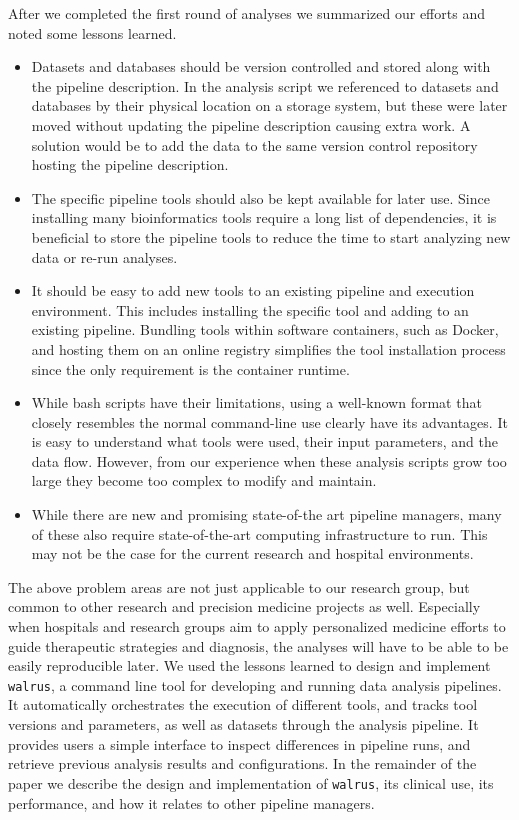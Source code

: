 After we completed the first round of analyses we summarized our efforts and
noted some lessons learned. 
\begin{itemize}
    \item  Datasets and databases should be version controlled and stored
        along with the pipeline description. In the analysis script we
        referenced to datasets and databases by their physical location on a
        storage system, but these were later moved without updating the pipeline
        description causing extra work. A solution would be to add the data to
        the same version control repository hosting the pipeline description.
    \item The specific pipeline tools should also be kept available for
        later use.  Since installing many bioinformatics tools require a long list
        of dependencies, it is beneficial to store the pipeline tools to reduce
        the time to start analyzing new data or re-run analyses. 
    \item It should be easy to add new tools to an existing
        pipeline and execution environment. This includes installing the specific
        tool and adding to an existing pipeline. Bundling tools within software
        containers, such as Docker, and hosting them on an online registry
        simplifies the tool installation process since the only requirement is
        the container runtime.
    \item While bash scripts have their
        limitations, using a well-known format that closely resembles the normal
        command-line use clearly have its advantages. It is easy to understand
        what tools were used, their input parameters, and the data flow.
        However, from our experience when these analysis scripts grow too large
        they become too complex to modify and maintain. 
    \item While there are new and promising state-of-the art pipeline
        managers, many of these also require state-of-the-art computing
        infrastructure to run. This may not be the case for the current research
        and hospital environments. 
\end{itemize} 


The above problem areas are not just applicable to our research group, but
common to other research and precision medicine projects as well. Especially
when hospitals and research groups aim to apply personalized medicine efforts to
guide therapeutic strategies and diagnosis, the analyses will have to be able to
be easily reproducible later. We used the lessons learned to  design and
implement \texttt{walrus}, a command line tool for developing and running data
analysis pipelines. It automatically orchestrates the execution of different
tools, and tracks tool versions and parameters, as well as datasets through the
analysis pipeline. It provides users a simple interface to inspect differences
in pipeline runs, and retrieve previous analysis results and configurations. In
the remainder of the paper we describe the design and implementation of
\texttt{walrus}, its clinical use, its performance, and how it relates to other
pipeline managers. 

